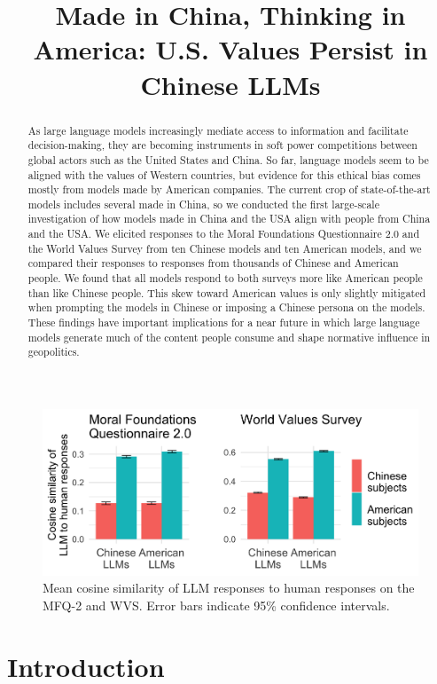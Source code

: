 \documentclass[11pt,a4paper]{article}
\title{Made in China, Thinking in America: U.S. Values Persist in Chinese LLMs}
\begin{document}
\maketitle
\begin{abstract}
  As large language models increasingly mediate access to information and facilitate decision-making, they are becoming instruments in soft power competitions between global actors such as the United States and China. So far, language models seem to be aligned with the values of Western countries, but evidence for this ethical bias comes mostly from models made by American companies. The current crop of state-of-the-art models includes several made in China, so we conducted the first large-scale investigation of how models made in China and the USA align with people from China and the USA. We elicited responses to the Moral Foundations Questionnaire 2.0 and the World Values Survey from ten Chinese models and ten American models, and we compared their responses to responses from thousands of Chinese and American people. We found that all models respond to both surveys more like American people than like Chinese people. This skew toward American values is only slightly mitigated when prompting the models in Chinese or imposing a Chinese persona on the models. These findings have important implications for a near future in which large language models generate much of the content people consume and shape normative influence in geopolitics.
\end{abstract}

\begin{figure}
    \centering
    \includegraphics[width=1\linewidth]{fig1.png}
    \caption{Mean cosine similarity of LLM responses to human responses on the MFQ-2 and WVS. Error bars indicate 95\% confidence intervals.}
    \label{fig1}
\end{figure}

\section{Introduction}
\end{document}
